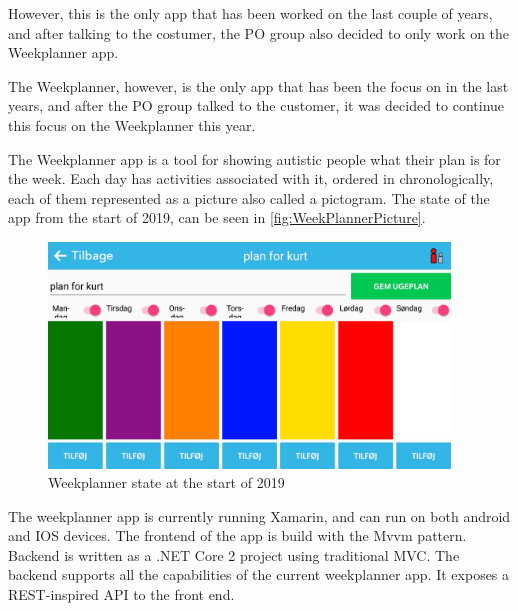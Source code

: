However, this is the only app that has been worked on the last couple of years, and after talking to the costumer, the \gls{PO} group also decided to only work on the Weekplanner app.  \newline

The Weekplanner, however, is the only app that has been the focus on in the last years, and after the \gls{PO} group talked to the customer, it was decided to continue this focus on the Weekplanner this year.

The Weekplanner app is a tool for showing autistic people what their plan is for the week. Each day has activities associated with it, ordered in chronologically, each of them represented as a picture also called a pictogram. The state of the app from the start of 2019, can be seen in \autoref{fig:WeekPlannerPicture}.

\begin{figure}[ht]
        \begin{center}
            \includegraphics[width=0.95\textwidth]{figures/WeekPlannerPicture}
        \end{center}
        \caption{Weekplanner state at the start of 2019}
        \label{fig:WeekPlannerPicture}
\end{figure}

\noindent
The weekplanner app is currently running Xamarin, and can run on both android and IOS devices. The frontend of the app is build with the \gls{Mvvm} pattern.
Backend is written as a .NET Core 2 project using traditional MVC. The backend supports all the capabilities of the current weekplanner app. It exposes a REST-inspired API to the front end.
